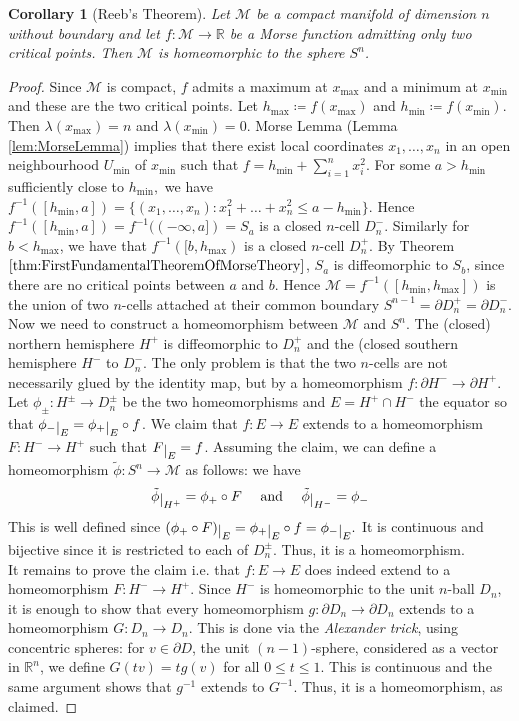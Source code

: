\documentclass[10pt]{article}
\theoremstyle{plain}
\newtheorem{corollary}[thm]{Corollary}
\theoremstyle{definition}
\newcommand{\myand}{\text{ and }}
\newcommand{\Real}{\mathbb{R}}
\newcommand{\man}{\mathcal{M}}
\newcommand{\sumfromto}[2]{\sum\limits_{#1}^{#2}}
\def\restrict#1{\raise-.5ex\hbox{\ensuremath|}_{#1}}
\newcommand{\finv}{f^{-1}}
\begin{document}
\begin{corollary}[Reeb's Theorem]\label{cor:Reeb'sTheorem}
    Let $\man$ be a compact manifold of dimension $n$ without boundary and let $f:\man \to \Real$ be a Morse function admitting only two critical points. Then $\man$ is homeomorphic to the sphere $S^n$.
\end{corollary}

\begin{proof}
    Since $\man$ is compact, $f$ admits a maximum at $x_{\max}$ and a minimum at $x_{\min}$ and these are the two critical points. Let $h_{\max}\coloneqq f(x_{\max} ) $ and $h_{\min} \coloneqq f(x_{\min})$. Then $\lambda (x_{\max}) = n$ and $\lambda(x_{\min}) = 0$. Morse Lemma (Lemma \ref{lem:MorseLemma}) implies that there exist local coordinates $x_1, \ldots , x_n$ in an open neighbourhood $U_{\min}$ of $x_{\min}$ such that $f = h_{\min} + \sumfromto{i=1}{n} x_i^2$. For some $a > h_{\min}$ sufficiently close to $h_{\min},$ we have $\finv([h_{\min},a]) = \{(x_1,\ldots,x_n):x_1^2 + \dots +x_n^2 \leq a- h_{\min}\}.$ Hence $\finv ([h_{\min},a]) = \finv((-\infty,a])=S_a$ is a closed $n$-cell $D_n^-$. Similarly for $b < h_{\max}$, we have that $\finv([b,h_{\max})$ is a closed $n$-cell $D_n^+$. By Theorem $\ref{thm:FirstFundamentalTheoremOfMorseTheory}$, $S_a$ is diffeomorphic to $S_b$, since there are no critical points between $a$ and $b$. Hence $\man = \finv([h_{\min},h_{\max}])$ is the union of two $n$-cells attached at their common boundary $S^{n-1} = \partial D_n^+ = \partial D_n^-$.\\
    Now we need to construct a homeomorphism between $\man$ and $S^n$. The (closed) northern hemisphere $H^+$ is diffeomorphic to $D_n^+$ and the (closed southern hemisphere $H^-$ to $D_n^-$. The only problem is that the two $n$-cells are not necessarily glued by the identity map, but by a homeomorphism $f: \partial H^- \to \partial H^+$. Let $\phi_{\pm} : H^{\pm} \to D_n^{\pm}$ be the two homeomorphisms and $ E = H^+ \cap H^-$ the equator so that $\phi_- \restrict{E} = \phi_+\restrict{E} \circ f$. We claim that $f : E \to E$ extends to a homeomorphism $F:H^- \to H^+$ such that $F\restrict{E} = f$. Assuming the claim, we can define a homeomorphism $\tilde{\phi} : S^n \to \man$ as follows: we have     $$\tilde{\phi}\restrict{H^+} = \phi _+ \circ F \quad \myand     \quad \tilde{\phi}\restrict{H^-} = \phi_-$$
    This is well defined since $(\phi_+ \circ F) \restrict{E} = \phi_+ \restrict{E} \circ f = \phi_-\restrict{E}.$ It is continuous and bijective since it is restricted to each of $D_n^{\pm}.$ Thus, it is a homeomorphism.\\
    It remains to prove the claim i.e. that $f:E\to E$ does indeed extend to a homeomorphism $F:H^- \to H^+$. Since $H^-$ is homeomorphic to the unit $n$-ball $D_n$, it is enough to show that every homeomorphism $g:\partial D_n \to \partial D_n$ extends to a homeomorphism $G:D_n \to D_n$. This is done via the \textit{Alexander trick}, using concentric spheres: for $v \in \partial D$, the unit $(n-1)$-sphere, considered as a vector in $\Real^n$, we define $G(tv)  = tg(v)$ for all $0\leq t \leq 1$. This is continuous and the same argument shows that $g^{-1}$ extends to $G^{-1}$. Thus, it is a homeomorphism, as claimed.
\end{proof}
\end{document}
